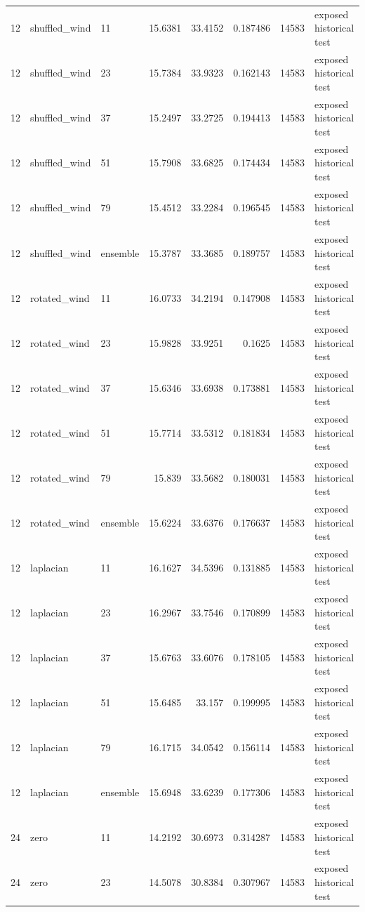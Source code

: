 \begin{tabular}{rllrrrrl}
12 & shuffled\_wind & 11 & 15.6381 & 33.4152 & 0.187486 & 14583 & exposed historical test \\
12 & shuffled\_wind & 23 & 15.7384 & 33.9323 & 0.162143 & 14583 & exposed historical test \\
12 & shuffled\_wind & 37 & 15.2497 & 33.2725 & 0.194413 & 14583 & exposed historical test \\
12 & shuffled\_wind & 51 & 15.7908 & 33.6825 & 0.174434 & 14583 & exposed historical test \\
12 & shuffled\_wind & 79 & 15.4512 & 33.2284 & 0.196545 & 14583 & exposed historical test \\
12 & shuffled\_wind & ensemble & 15.3787 & 33.3685 & 0.189757 & 14583 & exposed historical test \\
12 & rotated\_wind & 11 & 16.0733 & 34.2194 & 0.147908 & 14583 & exposed historical test \\
12 & rotated\_wind & 23 & 15.9828 & 33.9251 & 0.1625 & 14583 & exposed historical test \\
12 & rotated\_wind & 37 & 15.6346 & 33.6938 & 0.173881 & 14583 & exposed historical test \\
12 & rotated\_wind & 51 & 15.7714 & 33.5312 & 0.181834 & 14583 & exposed historical test \\
12 & rotated\_wind & 79 & 15.839 & 33.5682 & 0.180031 & 14583 & exposed historical test \\
12 & rotated\_wind & ensemble & 15.6224 & 33.6376 & 0.176637 & 14583 & exposed historical test \\
12 & laplacian & 11 & 16.1627 & 34.5396 & 0.131885 & 14583 & exposed historical test \\
12 & laplacian & 23 & 16.2967 & 33.7546 & 0.170899 & 14583 & exposed historical test \\
12 & laplacian & 37 & 15.6763 & 33.6076 & 0.178105 & 14583 & exposed historical test \\
12 & laplacian & 51 & 15.6485 & 33.157 & 0.199995 & 14583 & exposed historical test \\
12 & laplacian & 79 & 16.1715 & 34.0542 & 0.156114 & 14583 & exposed historical test \\
12 & laplacian & ensemble & 15.6948 & 33.6239 & 0.177306 & 14583 & exposed historical test \\
24 & zero & 11 & 14.2192 & 30.6973 & 0.314287 & 14583 & exposed historical test \\
24 & zero & 23 & 14.5078 & 30.8384 & 0.307967 & 14583 & exposed historical test \\

\end{tabular}
